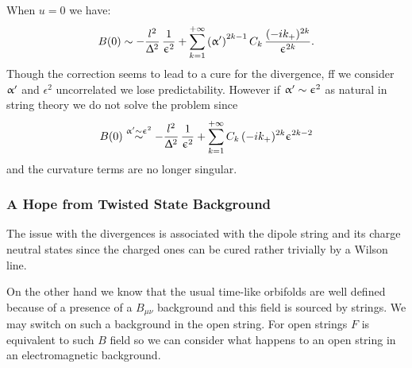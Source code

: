 When $u = 0$ we have:
\begin{equation}
  B(0)
  \sim
  - \frac{l^2}{\Updelta^2}\, \frac{1}{\upepsilon^2}
  +
  \sum\limits_{k = 1}^{+\infty}
  \qty(\upalpha')^{2k-1}\,
  C_k\,
  \frac{(-i k_+)^{2k}}{\upepsilon^{2 k}}.
\end{equation}
Though the correction seems to lead to a cure for the divergence, ff we consider $\upalpha'$ and $\epsilon^2$ uncorrelated we lose predictability.
However if $\upalpha' \sim \upepsilon^2$ as natural in string theory we do not solve the problem since 
\begin{equation}
  B(0)
  \stackrel{\upalpha' \sim \upepsilon^2}{\sim}
  - \frac{l^2}{\Updelta^2}\, \frac{1}{\upepsilon^2}
  +
  \sum\limits_{k = 1}^{+\infty}
  C_k\,
  (-i k_+)^{2k}
  \upepsilon^{2k - 2}
\end{equation}
and the curvature terms are no longer singular.
    

\subsubsection{A Hope from Twisted State Background}

The issue with the divergences is associated with the dipole string and its charge neutral states since the charged ones can be cured rather trivially by a Wilson line.

On the other hand we know that the usual time-like orbifolds are well defined because of a presence of a $B_{\mu\nu}$ background and this field is sourced by strings.
We may switch on such a background in the open string.
For open strings $F$ is equivalent to such $B$ field so we can consider what happens to an open string in an electromagnetic background.

